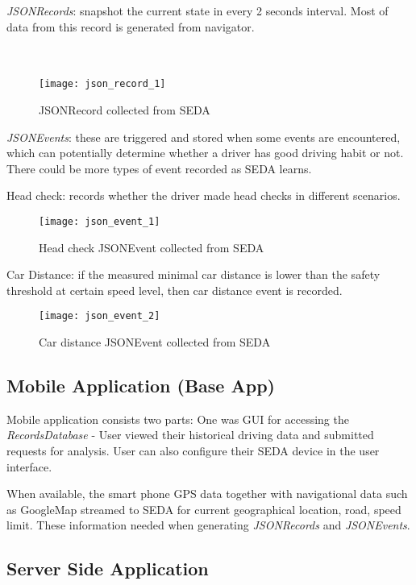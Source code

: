 \documentclass[main.tex]{subfiles}
\begin{document}
\emph{JSONRecords}: snapshot the current state in every 2 seconds interval. Most of data from this record is generated from navigator. 
\\
\\
\\

\begin{figure}
\caption{JSONRecord collected from SEDA}
\centering
\texttt{[image: json\_record\_1]}
\end{figure}

\emph{JSONEvents}: these are triggered and stored when some events are encountered, which can potentially determine whether a driver has good driving habit or not. There could be more types of event recorded as SEDA learns.

Head check: records whether the driver made head checks in different scenarios.

\begin{figure}
\caption{Head check JSONEvent collected from SEDA}
\centering
\texttt{[image: json\_event\_1]}
\end{figure}


Car Distance: if the measured minimal car distance is lower than the safety threshold at certain speed level, then car distance event is recorded.

\begin{figure}
\caption{Car distance JSONEvent collected from SEDA}
\centering
\texttt{[image: json\_event\_2]}
\end{figure}

\subsection{Mobile Application (Base App)}


Mobile application consists two parts:
One was GUI for accessing the \emph{RecordsDatabase} - User viewed their historical driving data and submitted requests for analysis. User can also configure their SEDA device in the user interface. 

When available, the smart phone GPS data together with navigational data such as GoogleMap streamed to SEDA for  current geographical location, road, speed limit. These information needed when generating \emph{JSONRecords} and \emph{JSONEvents}.



\subsection{Server Side Application}
 
\end{document}
